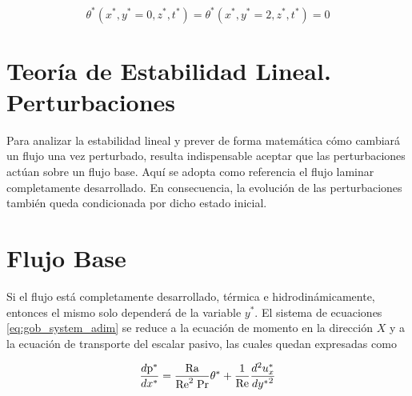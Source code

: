 \begin{equation}
\theta^*(x^*,y^*=0,z^*,t^*) = \theta^*(x^*,y^*=2,z^*,t^*) = 0
\label{eq:dirichlet_adim_theta}
\end{equation}





\section{Teoría de Estabilidad Lineal. Perturbaciones} \label{line_an}

Para analizar la estabilidad lineal y prever de forma matemática cómo cambiará un flujo una vez perturbado, resulta indispensable aceptar que las perturbaciones actúan sobre un flujo base. Aquí se adopta como referencia el flujo laminar completamente desarrollado. En consecuencia, la evolución de las perturbaciones también queda condicionada por dicho estado inicial.



\section{Flujo Base}

Si el flujo está completamente desarrollado, térmica e hidrodinámicamente, entonces el mismo solo dependerá de la variable $y^*$. El sistema de ecuaciones \ref{eq:gob_system_adim} se reduce a la ecuación de momento en la dirección $X$ y a la ecuación de transporte del escalar pasivo, las cuales quedan expresadas como 

\begin{equation}
\frac{d \text{p}^* }{d x^*} = \frac{\text{Ra}}{\text{Re}^2 \hspace{1mm} \text{Pr}} \theta^* + \frac{1}{\text{Re}} \frac{d^2 u^*_x}{d {y^*}^2}
\label{eq:base1}
\end{equation}

